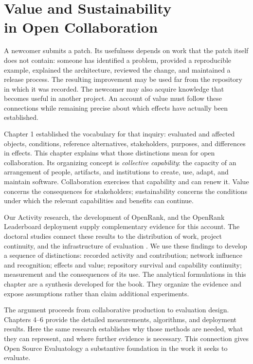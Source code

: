 \chapter[Value and Sustainability in Open Collaboration]{Value and Sustainability\\in Open Collaboration}
\label{ch:two}

A newcomer submits a patch. Its usefulness depends on work that the patch itself does not contain: someone has identified a problem, provided a reproducible example, explained the architecture, reviewed the change, and maintained a release process. The resulting improvement may be used far from the repository in which it was recorded. The newcomer may also acquire knowledge that becomes useful in another project. An account of value must follow these connections while remaining precise about which effects have actually been established.

Chapter 1 established the vocabulary for that inquiry: evaluated and affected objects, conditions, reference alternatives, stakeholders, purposes, and differences in effects. This chapter explains what those distinctions mean for open collaboration. Its organizing concept is \emph{collective capability}: the capacity of an arrangement of people, artifacts, and institutions to create, use, adapt, and maintain software. Collaboration exercises that capability and can renew it. Value concerns the consequences for stakeholders; sustainability concerns the conditions under which the relevant capabilities and benefits can continue.

Our Activity research, the development of OpenRank, and the OpenRank Leaderboard deployment supply complementary evidence for this account. The doctoral studies connect these results to the distribution of work, project continuity, and the infrastructure of evaluation \citep{xia2024thesis,zhao2025thesis}. We use these findings to develop a sequence of distinctions: recorded activity and contribution; network influence and recognition; effects and value; repository survival and capability continuity; measurement and the consequences of its use. The analytical formulations in this chapter are a synthesis developed for the book. They organize the evidence and expose assumptions rather than claim additional experiments.

The argument proceeds from collaborative production to evaluation design. Chapters 4--6 provide the detailed measurements, algorithms, and deployment results. Here the same research establishes why those methods are needed, what they can represent, and where further evidence is necessary. This connection gives Open Source Evaluatology a substantive foundation in the work it seeks to evaluate.

